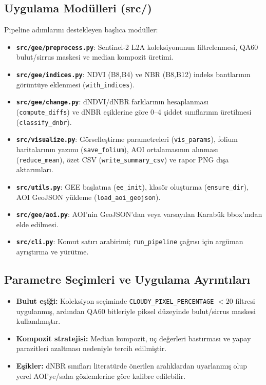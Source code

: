 \documentclass[11pt,a4paper]{article}
\begin{document}
\subsection*{Uygulama Modülleri (src/)}
Pipeline adımlarını destekleyen başlıca modüller:
\begin{itemize}
  \item \textbf{\texttt{src/gee/preprocess.py}}: Sentinel-2 L2A koleksiyonunun filtrelenmesi, QA60 bulut/sirrus maskesi ve median kompozit üretimi.
  \item \textbf{\texttt{src/gee/indices.py}}: NDVI (B8,B4) ve NBR (B8,B12) indeks bantlarının görüntüye eklenmesi (\texttt{with\_indices}).
  \item \textbf{\texttt{src/gee/change.py}}: dNDVI/dNBR farklarının hesaplanması (\texttt{compute\_diffs}) ve dNBR eşiklerine göre 0--4 şiddet sınıflarının üretilmesi (\texttt{classify\_dnbr}).
  \item \textbf{\texttt{src/visualize.py}}: Görselleştirme parametreleri (\texttt{vis\_params}), folium haritalarının yazımı (\texttt{save\_folium}), AOI ortalamasının alınması (\texttt{reduce\_mean}), özet CSV (\texttt{write\_summary\_csv}) ve rapor PNG dışa aktarımları.
  \item \textbf{\texttt{src/utils.py}}: GEE başlatma (\texttt{ee\_init}), klasör oluşturma (\texttt{ensure\_dir}), AOI GeoJSON yükleme (\texttt{load\_aoi\_geojson}).
  \item \textbf{\texttt{src/gee/aoi.py}}: AOI'nin GeoJSON'dan veya varsayılan Karabük bbox'ından elde edilmesi.
  \item \textbf{\texttt{src/cli.py}}: Komut satırı arabirimi; \texttt{run\_pipeline} çağrısı için argüman ayrıştırma ve yürütme.
\end{itemize}

\subsection*{Parametre Seçimleri ve Uygulama Ayrıntıları}
\begin{itemize}
  \item \textbf{Bulut eşiği:} Koleksiyon seçiminde \texttt{CLOUDY\_PIXEL\_PERCENTAGE} $<20$
  filtresi uygulanmış, ardından QA60 bitleriyle piksel düzeyinde bulut/sirrus maskesi
  kullanılmıştır.
  \item \textbf{Kompozit stratejisi:} Median kompozit, uç değerleri bastırması ve
  yapay parazitleri azaltması nedeniyle tercih edilmiştir.
  \item \textbf{Eşikler:} dNBR sınıfları literatürde önerilen aralıklardan uyarlanmış
  olup yerel AOI’ye/saha gözlemlerine göre kalibre edilebilir.
\end{itemize}
\end{document}
